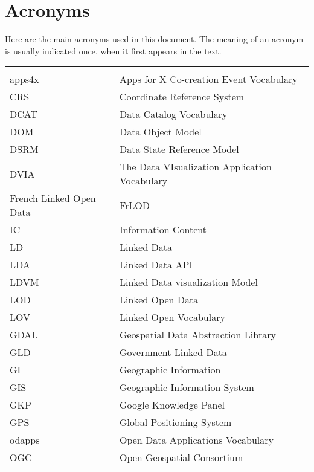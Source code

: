 

\chapter*{Acronyms}

Here are the main acronyms used in this document. The meaning of an acronym is usually indicated once, when it first appears in the text. 


\begin{longtable}{lp{11cm}}
  &\\
  apps4x	 & Apps for X Co-creation Event Vocabulary\\
  CRS &  Coordinate Reference System\\
  
  DCAT & Data Catalog Vocabulary\\
  DOM  & Data Object Model \\
  DSRM & Data State Reference Model \\
  DVIA & The Data VIsualization Application Vocabulary\\
  
  French Linked Open Data & FrLOD \\
  
  IC & Information Content   \\
  LD  &  Linked Data\\
  LDA &  Linked Data API \\
  LDVM & Linked Data visualization Model \\
  LOD &  Linked Open Data\\ 
  
  
  LOV &  Linked Open Vocabulary\\
  
  GDAL& Geospatial Data Abstraction Library \\
  GLD &  Government Linked Data\\
  GI  &  Geographic Information\\
  GIS &  Geographic Information System\\
  GKP &  Google Knowledge Panel \\
  GPS &  Global Positioning System \\
  
  odapps	 & Open Data Applications Vocabulary\\
  OGC &  Open Geospatial Consortium\\
  

\end{longtable}
